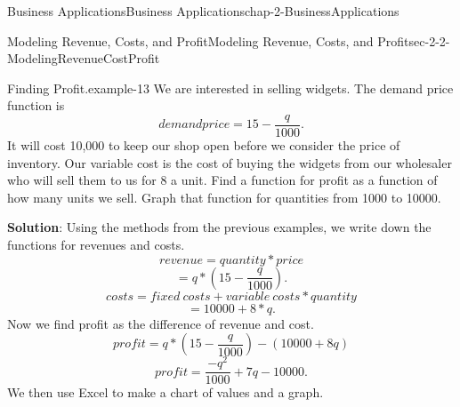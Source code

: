 \documentclass[oneside,10pt,]{book}
\newcommand{\terminology}[1]{\textbf{#1}}
\numberwithin{equation}{section}
\begin{document}
\begin{chapterptx}{Business Applications}{}{Business Applications}{}{}{chap-2-BusinessApplications}
\begin{sectionptx}{Modeling Revenue, Costs, and Profit}{}{Modeling Revenue, Costs, and Profit}{}{}{sec-2-2-ModelingRevenueCostProfit}
\begin{sidebyside}{1}{0.2}{0.2}{0}
\begin{sbspanel}{0.6}
\end{sbspanel}%
\end{sidebyside}%
\begin{example}{Finding Profit.}{example-13}%
\hypertarget{p-660}{}%
We are interested in selling widgets.  The demand price function is%
%
\begin{equation*}
demand price=15-\frac{q}{1000}.
\end{equation*}
\hypertarget{p-661}{}%
It will cost \textdollar{}10,000 to keep our shop open before we consider the price of inventory.  Our variable cost is the cost of buying the widgets from our wholesaler who will sell them to us for \textdollar{}8 a unit.  Find a function for profit as a function of how many units we sell.  Graph that function for quantities from 1000 to 10000.%
\par
\hypertarget{p-662}{}%
\terminology{Solution}: Using the methods from the previous examples, we write down the functions for revenues and costs.%
%
\begin{equation*}
revenue=quantity*price
\end{equation*}
%
\begin{equation*}
=q*(15-\frac{q}{1000}).
\end{equation*}
%
\begin{equation*}
costs=fixed\ costs+variable\ costs*quantity
\end{equation*}
%
\begin{equation*}
=10000+8*q.
\end{equation*}
\hypertarget{p-663}{}%
Now we find profit as the difference of revenue and cost.%
%
\begin{equation*}
profit= q*(15-\frac{q}{1000})-(10000+8q)
\end{equation*}
%
\begin{equation*}
profit= \frac{-q^2}{1000}+7q-10000.
\end{equation*}
\hypertarget{p-664}{}%
We then use Excel to make a chart of values and a graph.%
\begin{sidebyside}{1}{0.2}{0.2}{0}%
\begin{sbspanel}{0.6}%

\end{sbspanel}
\end{sidebyside}
\end{example}
\end{sectionptx}
\end{chapterptx}
\end{document}
